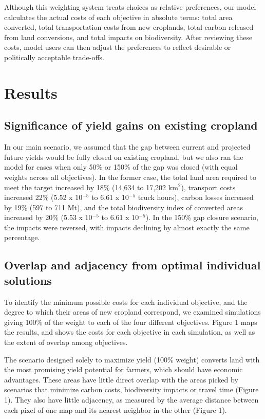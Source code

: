 \documentclass[a4paper]{article}
\begin{document}
{Although this weighting system treats choices as relative preferences, our model calculates the actual costs of each objective in absolute terms:  total area converted, total transportation costs from new croplands, total carbon released from land conversions, and total impacts on biodiversity. After reviewing these costs, model users can then adjust the preferences to reflect desirable or politically acceptable trade-offs.

\section*{\large Results}

\subsection*{Significance of yield gains on existing cropland}

In our main scenario, we assumed that the gap between current and projected future yields would be fully closed on existing cropland, but we also ran the model for cases when only 50\% or 150\% of the gap was closed (with equal weights across all objectives). In the former case, the total land area required to meet the target increased by 18\% (14,634 to 17,202 km$^2$), transport costs increased 22\% (5.52 x 10$^{-5}$ to 6.61 x 10$^{-5}$ truck hours), carbon losses increased by 19\% (597 to 711 Mt), and the total biodiversity index of converted areas increased by 20\% (5.53 x 10$^{-5}$ to 6.61 x 10$^{-5}$).   In the 150\% gap closure scenario, the impacts were reversed, with impacts declining by almost exactly the same percentage. 

\subsection*{Overlap and adjacency from optimal individual solutions}

To identify the minimum possible costs for each individual objective, and the degree to which their areas of new cropland correspond, we examined simulations giving 100\% of the weight to each of the four different objectives. Figure 1 maps the results, and shows the costs for each objective in each simulation, as well as the extent of overlap among objectives. 

The scenario designed solely to maximize yield (100\% weight) converts land with the most promising yield potential for farmers, which should have economic advantages.  These areas have little direct overlap with the areas picked by scenarios that minimize carbon costs, biodiversity impacts or travel time (Figure 1).  They also have little adjacency, as measured by the average distance between each pixel of one map and its nearest neighbor in the other (Figure 1). 
 
}
\end{document}
